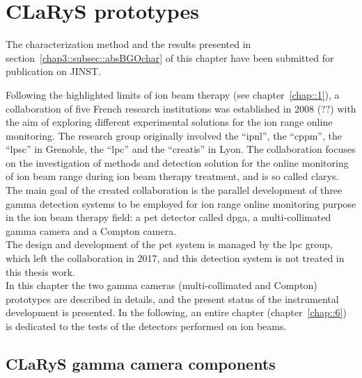\chapter{CLaRyS prototypes}\label{chap::3}

The characterization method and the results presented in section~\ref{chap3::subsec::absBGOchar} of this chapter have been submitted for publication on JINST.

\vfill

\minitoc

\newpage

\glsresetall


Following the highlighted limits of ion beam therapy (see chapter~\ref{chap::1}), a collaboration of five French research institutions was established in 2008 (??) with the aim of exploring different experimental solutions for the ion range online monitoring. The research group originally involved the \enquote{\gls{ipnl}}, the \enquote{\gls{cppm}}, the \enquote{\gls{lpsc}} in Grenoble, the \enquote{\gls{lpc}} and the \enquote{\gls{creatis}} in Lyon. The collaboration focuses on the investigation of methods and detection solution for the online monitoring of ion beam range during ion beam therapy treatment, and is so called \gls{clarys}.\\
The main goal of the created collaboration is the parallel development of three gamma detection systems to be employed for ion range online monitoring purpose in the ion beam therapy field: a \gls{pet} detector called \gls{dpga}, a multi-collimated gamma camera and a Compton camera.\\ The design and development of the \gls{pet} system is managed by the \gls{lpc} group, which left the collaboration in 2017, and this detection system is not treated in this thesis work.\\ 
In this chapter the two gamma cameras (multi-collimated and Compton) prototypes are described in details, and the present status of the instrumental development is presented. In the following, an entire chapter (chapter~\ref{chap::6}) is dedicated to the tests of the detectors performed on ion beams. 

\section{CLaRyS gamma camera components}\label{chap3::sec::CLaRyScameras}

